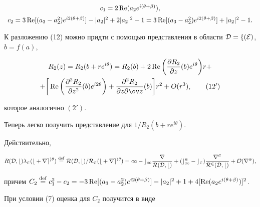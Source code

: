 \begin{pf}
\begin{equation}
\begin{array}{c}
c_1=2\re(a_2e^{i(\theta+\beta)}), \\[2mm] 


c_2=3\re[(a_3-a^2_2)e^{i2(\theta+\beta)}]-|a_2|^2 


+2|a_2|^2-1=3\re[(a_3-a^2_2)e^{i2(\theta+\beta)}] 


+|a_2|^2-1. 


\end{array} 


\end{equation} 


 


К разложению (12) можно придти с помощью представления в области $\cal 


D=f(E)$, $b=f(a)$,


\begin{multline} 


R_2(z)=R_2(b+r e^{i\theta})=R_2(b)+2\re\bigg( 


\frac{\partial R_2}{\partial z}(b)e^{i\theta}\bigg)r+ \\ +\bigg[\re 


\bigg(\frac{\partial^2R_2}{\partial z^2}(b)e^{i2\theta}\bigg)+ 


\frac{\partial^2R_2}{\partial z\partial\ov z}(b)\bigg] 


r^2+O(r^3),\tag{12$'$} 


\end{multline} 


которое аналогично $(2')$. 


 


Теперь легко получить представление для $1/R_2(b+r e^{i\theta})$. 


Действительно, 


$$ 


R(\cal D,b)\lambda_2(b+r e^{i\theta})\eqdef R(\cal D,b)/R_2 


(b+r e^{i\theta})=1-c_1\frac{r}{R(\cal D,b)}+(c^2_1-c_2) 


\frac{r^2}{R^2(\cal D,b)}+O(r^3), 


$$ 


причем $C_2\eqdef c^2_1-c_2=-3\re[(a_3-a^2_2)e^{i2(\theta+\beta)}]- 


|a_2|^2+1+4[\re(a_2e^{i(\theta+\beta)})]^2$. 


 


При условии (7) оценка для $C_2$ получится в виде 


$$ 



\end{pf}
